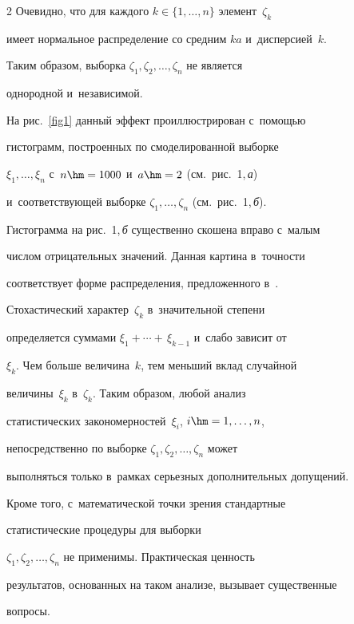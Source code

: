 \begin{multicols}{2}
Очевидно, что для каждого $k\in\{1,\ldots,n\}$ элемент~$\zeta_k$


имеет нормальное распределение со средним $ka$ и~дисперсией~$k$.


Таким образом, выборка $\zeta_1,\zeta_2,\ldots,\zeta_n$ не является


однородной и~независимой.





На рис.~\ref{fig1} данный эффект проиллюстрирован с~помощью


гистограмм, построенных по смоделированной выборке


$\xi_1,\ldots,\xi_n$  с~$n\hm=1000$ и~$a\hm=2$ (см.\ рис.~1,\,\textit{а}) 


и~соответствующей выборке $\zeta_1,\ldots,\zeta_n$ (см.\ рис.~1,\,\textit{б}). 


Гистограмма на рис.~1,\,\textit{б} существенно скошена вправо с~малым


числом отрицательных значений. Данная картина в~точности


соответствует форме распределения, предложенного в~\cite{Gulev2012}.








Стохастический характер~$\zeta_k$  в~значительной степени


определяется суммами $\xi_1+\cdots+\,\xi_{k-1}$ и~слабо зависит от


$\xi_k$. Чем больше величина~$k$, тем меньший вклад случайной


величины~$\xi_k$ в~$\zeta_k$. Таким образом, любой анализ


статистических закономерностей~$\xi_i$, $i\hm=1,\ldots,n$,


непосредственно по выборке $\zeta_1,\zeta_2,\ldots,\zeta_n$ может


выполняться только в~рамках серь\-ез\-ных дополнительных допущений.


Кроме того, с~математической точки зрения стандартные


статистические процедуры для выборки


$\zeta_1,\zeta_2,\ldots,\zeta_n$ не применимы. Практическая ценность


результатов, основанных на таком анализе, вызывает существенные


вопросы.






\end{multicols}
